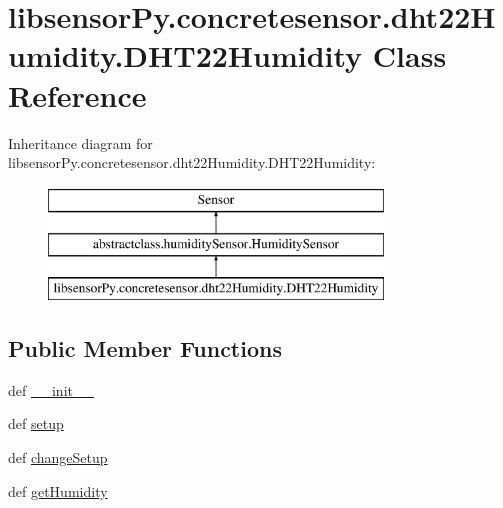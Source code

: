 \hypertarget{classlibsensorPy_1_1concretesensor_1_1dht22Humidity_1_1DHT22Humidity}{}\section{libsensor\+Py.\+concretesensor.\+dht22\+Humidity.\+D\+H\+T22\+Humidity Class Reference}
\label{classlibsensorPy_1_1concretesensor_1_1dht22Humidity_1_1DHT22Humidity}
Inheritance diagram for libsensor\+Py.\+concretesensor.\+dht22\+Humidity.\+D\+H\+T22\+Humidity\+:\begin{figure}[H]
\begin{center}
\leavevmode
\includegraphics[height=3.000000cm]{classlibsensorPy_1_1concretesensor_1_1dht22Humidity_1_1DHT22Humidity}
\end{center}
\end{figure}
\subsection*{Public Member Functions}
\begin{DoxyCompactItemize}
\item 
def \hyperlink{classlibsensorPy_1_1concretesensor_1_1dht22Humidity_1_1DHT22Humidity_a5574266605f1d7eec202df849ad3eb62}{\+\_\+\+\_\+init\+\_\+\+\_\+}
\item 
def \hyperlink{classlibsensorPy_1_1concretesensor_1_1dht22Humidity_1_1DHT22Humidity_a2b7dc7809d8f41603f75758f03bd69b3}{setup}
\item 
def \hyperlink{classlibsensorPy_1_1concretesensor_1_1dht22Humidity_1_1DHT22Humidity_a5d6dde160671b1152d4357d5a8993fd8}{change\+Setup}
\item 
def \hyperlink{classlibsensorPy_1_1concretesensor_1_1dht22Humidity_1_1DHT22Humidity_aa72eda7f0c06a40ae21ee5f816f4daf2}{get\+Humidity}
\end{DoxyCompactItemize}
